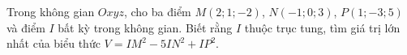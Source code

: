 \begin{ex}
Trong không gian $Oxyz$, cho ba điểm $M(2;1;-2)$, $N(-1;0;3)$, $P(1;-3;5)$ và điểm $I$ bất kỳ trong không gian. Biết rằng $I$ thuộc trục tung, tìm giá trị lớn nhất của biểu thức $V=IM^2-5IN^2+IP^2$.
\end{ex}
